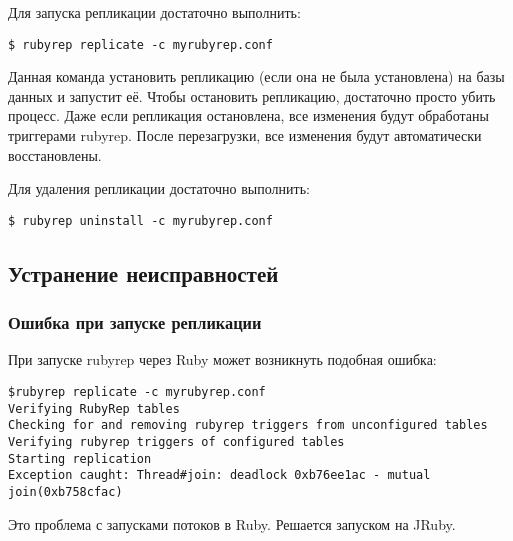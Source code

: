 Для запуска репликации достаточно выполнить:
\begin{lstlisting}[label=lst:rubyrep10,caption=Репликация]
$ rubyrep replicate -c myrubyrep.conf
\end{lstlisting}

Данная команда установить репликацию (если она не была установлена) на базы данных и запустит её. Чтобы остановить репликацию, достаточно просто убить процесс. Даже если репликация остановлена, все изменения будут обработаны триггерами rubyrep. После перезагрузки, все изменения будут автоматически восстановлены.

Для удаления репликации достаточно выполнить:

\begin{lstlisting}[label=lst:rubyrep11,caption=Репликация]
$ rubyrep uninstall -c myrubyrep.conf
\end{lstlisting}

\subsection{Устранение неисправностей}

\subsubsection{Ошибка при запуске репликации}

При запуске rubyrep через Ruby может возникнуть подобная ошибка:

\begin{lstlisting}[label=lst:rubyrep12,caption=Устранение неисправностей]
$rubyrep replicate -c myrubyrep.conf
Verifying RubyRep tables
Checking for and removing rubyrep triggers from unconfigured tables
Verifying rubyrep triggers of configured tables
Starting replication
Exception caught: Thread#join: deadlock 0xb76ee1ac - mutual join(0xb758cfac)
\end{lstlisting}

Это проблема с запусками потоков в Ruby. Решается запуском на JRuby.